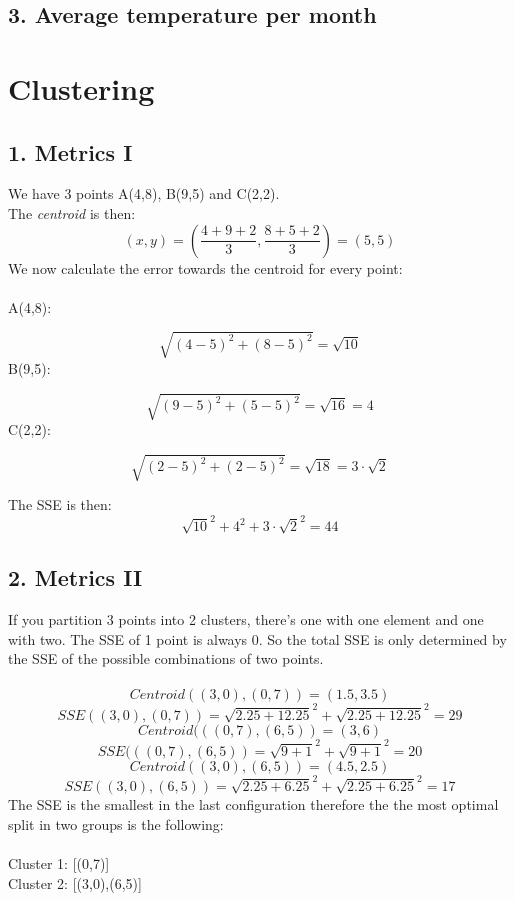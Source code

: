 \documentclass[11pt,a4paper]{article}
\begin{document}
\subsection*{3. Average temperature per month}


\pagebreak
\section*{Clustering}
\subsection*{1. Metrics I}
We have 3 points A(4,8), B(9,5) and C(2,2).\\
The \textit{centroid} is then:
$$ (x,y) = \left(\frac{4+9+2}{3},\frac{8+5+2}{3}\right)= (5,5)$$
We now calculate the error towards the centroid for every point:\\
\\
A(4,8):

$$\sqrt{(4-5)^2 + (8-5)^2} = \sqrt{10}$$
\noindent
B(9,5):

$$\sqrt{(9-5)^2 + (5-5)^2} = \sqrt{16} = 4$$
\noindent
C(2,2):

$$\sqrt{(2-5)^2 + (2-5)^2} = \sqrt{18} = 3\cdot\sqrt{2}$$

\noindent
The SSE is then:
$$\sqrt{10}^2 + 4^2 + 3\cdot\sqrt{2}^2 = 44$$

\subsection*{2. Metrics II}
If you partition 3 points into 2 clusters, there's one with one element and one with two.
The SSE of 1 point is always 0. So the total SSE is only determined by the SSE of the possible combinations of two points.
\\
\\
$$Centroid((3,0),(0,7))=(1.5,3.5)$$
$$SSE((3,0),(0,7))=\sqrt{2.25+12.25}^2 + \sqrt{2.25+12.25}^2 = 29$$
$$Centroid(((0,7),(6,5))=(3,6)$$
$$SSE(((0,7),(6,5))=\sqrt{9+1}^2 + \sqrt{9+1}^2 = 20$$
$$Centroid((3,0),(6,5))=(4.5,2.5)$$
$$SSE((3,0),(6,5))=\sqrt{2.25+6.25}^2 + \sqrt{2.25+6.25}^2 = 17$$
\noindent
The SSE is the smallest in the last configuration therefore the the most optimal split in two groups is the following:
\\
\\
Cluster 1: [(0,7)]\\
Cluster 2: [(3,0),(6,5)]
\end{document}

